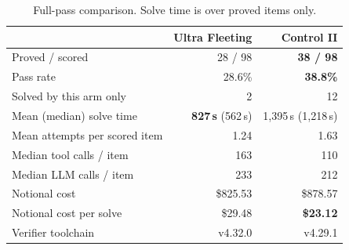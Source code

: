 \documentclass[12pt, a4paper]{article}
\begin{document}
\begin{table}[H]
\centering\small
\caption{Full-pass comparison. Solve time is over proved items only.}
\label{tab:headtohead}
\begin{tabular}{@{}lrr@{}}
\toprule
 & Ultra Fleeting & Control II \\
\midrule
Proved / scored          & 28 / 98 & \textbf{38 / 98} \\
Pass rate                & 28.6\% & \textbf{38.8\%} \\
Solved by this arm only  & 2 & 12 \\
Mean (median) solve time & \textbf{827\,s} (562\,s) & 1{,}395\,s (1{,}218\,s) \\
Mean attempts per scored item & 1.24 & 1.63 \\
Median tool calls / item      & 163 & 110 \\
Median LLM calls / item       & 233 & 212 \\
Notional cost                 & \$825.53 & \$878.57 \\
Notional cost per solve       & \$29.48 & \textbf{\$23.12} \\
Verifier toolchain            & v4.32.0 & v4.29.1 \\
\bottomrule
\end{tabular}
\end{table}
\end{document}
